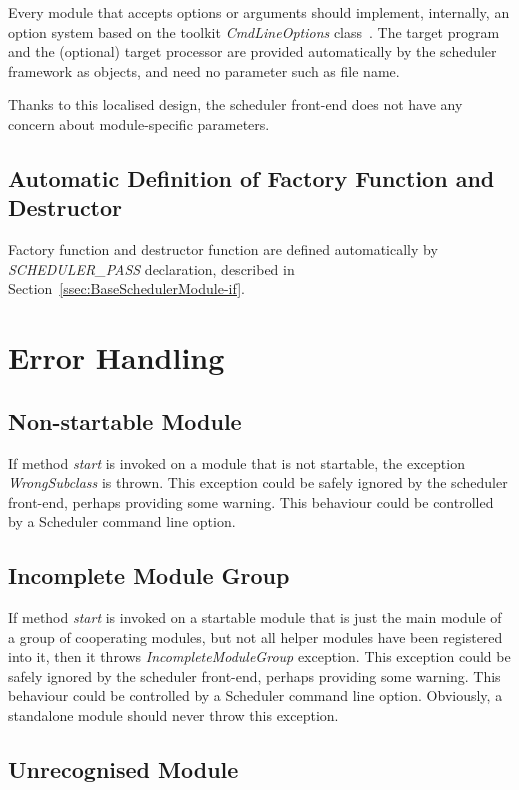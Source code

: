 \documentclass[a4paper,twoside]{tce}
\begin{document}
Every module that accepts options or arguments should implement, internally,
an option system based on the toolkit \emph{CmdLineOptions}
class~\cite{ToolkitDesign}. The target program and the (optional) target
processor are provided automatically by the scheduler framework as objects,
and need no parameter such as file name.

Thanks to this localised design, the scheduler front-end does not have any
concern about module-specific parameters.

\subsection{Automatic Definition of Factory Function and Destructor}
\label{ssec:automatic-export}

Factory function and destructor function are defined automatically by
\emph{SCHEDULER\_PASS} declaration, described in
Section~\ref{ssec:BaseSchedulerModule-if}.

\section{Error Handling}
\label{ssec:generic-pass-errors}

\subsection{Non-startable Module}

If method \emph{start} is invoked on a module that is not startable, the
exception \emph{WrongSubclass} is thrown. This exception could be safely
ignored by the scheduler front-end, perhaps providing some warning. This
behaviour could be controlled by a Scheduler command line option.

\subsection{Incomplete Module Group}

If method \emph{start} is invoked on a startable module that is just the
main module of a group of cooperating modules, but not all helper modules
have been registered into it, then it throws \emph{IncompleteModuleGroup}
exception. This exception could be safely ignored by the scheduler
front-end, perhaps providing some warning. This behaviour could be
controlled by a Scheduler command line option. Obviously, a standalone
module should never throw this exception.

\subsection{Unrecognised Module}
\end{document}
